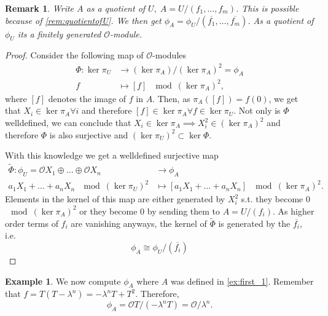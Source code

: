 \documentclass{article}
\theoremstyle{plain}%
\newtheorem{remark}[theorem]{Remark}
\theoremstyle{definition}
\newtheorem{example}[theorem]{Example}
\theoremstyle{remark}
\begin{document}
\begin{remark}\label{rem:tangentspace}
    Write \(A\) as a quotient of \(U,\; A = U/(f_1, \dots, f_m)\). 
    This is possible because of \cref{rem:quotientofU}.
    We then get \(\phi_A = \phi_U/(\overline{f_1}, \dots, \overline{f_m})\).
    As a quotient of \(\phi_U\) its a finitely generated \(\mathcal{O}\)-module.
\end{remark}
\begin{proof}
    Consider the following map of \(\mathcal{O}\)-modules
    \begin{align*}
        \Phi\colon \ker \pi_U &\to (\ker \pi_A)/(\ker \pi_A)^2 = \phi_A\\
        f &\mapsto [f] \; \mod (\ker \pi_A)^2,
    \end{align*}
    where \([f]\) denotes the image of \(f\) in \(A\).
    Then, as \(\pi_A([f]) = f(0)\), we get that \(X_i \in \ker \pi_A \forall i\)
    and therefore \([f] \in \ker \pi_A \forall f \in \ker \pi_U\). Not only is \(\Phi\) welldefined,
    we can conclude that \(X_i \in \ker \pi_A \implies X_i^2 \in (\ker \pi_A)^2\)
    and therefore \(\Phi\) is also surjective and \((\ker \pi_U)^2 \subset \ker \Phi\).
    
    With this knowledge we get a welldefined surjective map
    \begin{align*}
        \tilde \Phi\colon \phi_U = \mathcal{O}X_1 \oplus \dots \oplus \mathcal{O}X_n &\to \phi_A\\
        a_1X_1 + \dots + a_nX_n \; \mod (\ker \pi_U)^2 &\mapsto [a_1X_1 + \dots + a_nX_n] \; \mod (\ker \pi_A)^2.
    \end{align*}
    Elements in the kernel of this map are either generated by \(X_i^2\) s.t. they become 0 \(\mod (\ker \pi_A)^2\)
    or they become 0 by sending them to \(A = U/(f_i)\).
    As higher order terms of \(f_i\) are vanishing anyways, 
    the kernel of \(\tilde \Phi\) is generated by the \(\overline{f_i}\), i.e.
    \[
        \phi_A \cong \phi_U/(\overline{f_i})  
    \]
\end{proof}

\begin{example}\label{ex:first_phi}
    We now compute \(\phi_A\) where \(A\) was defined in \cref{ex:first_1}.
    Remember that \(f = T(T-\lambda^n) = -\lambda^n T + T^2\). Therefore,
    \[\phi_A = \mathcal{O}T/(-\lambda^n T) = \mathcal{O}/\lambda^n.\]
\end{example}
\end{document}
